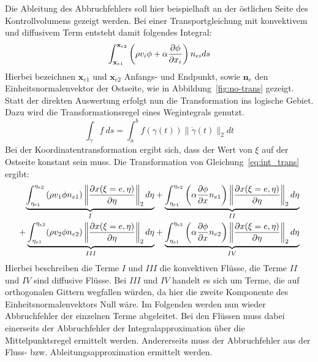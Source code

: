 \noindent Die Ableitung des Abbruchfehlers soll hier beispielhaft an der östlichen Seite des Kontrollvolumens
gezeigt werden. Bei einer Transportgleichung mit konvektivem und diffusivem Term entsteht damit folgendes
Integral:
\begin{equation}
  \int_{\mathbf{x}_{e1}}^{\mathbf{x}_{e2}}\left({\rho v_i\phi+\alpha \pder[\phi]{x_i}}\right)n_{ei}ds
  \label{eq:int_trans}
\end{equation}
Hierbei bezeichnen $\mathbf{x}_{e1}$ und $\mathbf{x}_{e2}$ Anfangs- und Endpunkt, sowie $\mathbf{n}_e$
den Einheitsnormalenvektor der Ostseite, wie in Abbildung~\ref{fig:no-trans} gezeigt.
Statt der direkten Auswertung erfolgt nun die Transformation ins logische Gebiet. Dazu wird die
Transformationsregel eines Wegintegrals genutzt.
\begin{equation}
  \int_{\gamma}f\ ds=\int_a^bf(\gamma (t)) \lVert \dot{\gamma}(t)\rVert_2 dt
\end{equation}
Bei der Koordinatentransformation ergibt sich, dass der Wert von $\xi$ auf der Ostseite konstant sein muss.
Die Transformation von Gleichung~\eqref{eq:int_trans} ergibt:
\begin{align*}
  \underbrace{
    \int_{\eta_{e1}}^{\eta_{e2}} \left({\rho v_1 \phi n_{e1}}\right)
  \left\lVert \frac{\partial x(\xi=e, \eta)}{\partial \eta} \right\rVert_2 d\eta
  }_I
  &+ \underbrace{
  \int_{\eta_{e1}}^{\eta_{e2}} \left({\alpha \pder[\phi]{x} n_{e1}}\right)
  \left\lVert \frac{\partial x(\xi=e, \eta)}{\partial \eta} \right\rVert_2 d\eta
}_{II}\\
  + \underbrace{
  \int_{\eta_{e1}}^{\eta_{e2}} (\rho v_2 \phi n_{e2})
  \left\lVert \frac{\partial x(\xi=e, \eta)}{\partial \eta} \right\rVert_2 d\eta
  }_{III}
  &+ \underbrace{
  \int_{\eta_{e1}}^{\eta_{e2}} \left({\alpha \pder[\phi]{x} n_{e2}}\right)
  \left\lVert \frac{\partial x(\xi=e, \eta)}{\partial \eta} \right\rVert_2 d\eta
  }_{IV}
\end{align*}
Hierbei beschreiben die Terme $I$ und $III$ die konvektiven Flüsse, die Terme $II$ und $IV$ sind
diffusive Flüsse. Bei $III$ und $IV$ handelt es sich um Terme, die auf orthogonalen Gittern wegfallen würden,
da hier die zweite Komponente des Einheitsnormalenvektors Null wäre.
Im Folgenden werden nun wieder Abbruchfehler der einzelnen Terme abgeleitet. Bei den Flüssen muss dabei
einerseits der Abbruchfehler der Integralapproximation über die Mittelpunktsregel ermittelt werden.
Andererseits muss der Abbruchfehler aus der Fluss- bzw. Ableitungsapproximation ermittelt werden.



